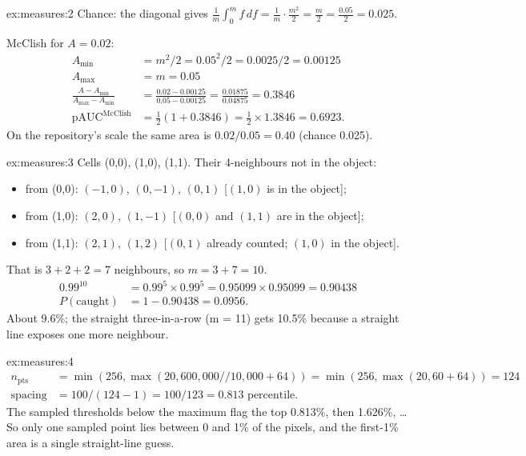 \begin{solution}{ex:measures:2}
Chance: the diagonal gives $\frac1m\int_0^m f\,df = \frac1m \cdot \frac{m^2}{2} = \frac m2 = \frac{0.05}{2} = 0.025$.

McClish for $A = 0.02$:
\begin{align*}
A_{\min} &= m^2/2 = 0.05^2 / 2 = 0.0025 / 2 = 0.00125\\
A_{\max} &= m = 0.05\\
\frac{A - A_{\min}}{A_{\max} - A_{\min}} &= \frac{0.02 - 0.00125}{0.05 - 0.00125} = \frac{0.01875}{0.04875} = 0.3846\\
\mathrm{pAUC}^{\text{McClish}} &= \tfrac12(1 + 0.3846) = \tfrac12 \times 1.3846 = 0.6923.
\end{align*}
On the repository's scale the same area is $0.02 / 0.05 = 0.40$ (chance 0.025).
\end{solution}

\begin{solution}{ex:measures:3}
Cells (0,0), (1,0), (1,1). Their 4-neighbours not in the object:
\begin{itemize}
\item from (0,0): $(-1,0)$, $(0,-1)$, $(0,1)$ [$(1,0)$ is in the object];
\item from (1,0): $(2,0)$, $(1,-1)$ [$(0,0)$ and $(1,1)$ are in the object];
\item from (1,1): $(2,1)$, $(1,2)$ [$(0,1)$ already counted; $(1,0)$ in the object].
\end{itemize}
That is $3 + 2 + 2 = 7$ neighbours, so $m = 3 + 7 = 10$.
\begin{align*}
0.99^{10} &= 0.99^5 \times 0.99^5 = 0.95099 \times 0.95099 = 0.90438\\
P(\text{caught}) &= 1 - 0.90438 = 0.0956.
\end{align*}
About 9.6\%; the straight three-in-a-row (m = 11) gets 10.5\% because a straight line exposes one more neighbour.
\end{solution}

\begin{solution}{ex:measures:4}
\begin{align*}
n_{\text{pts}} &= \min(256, \max(20, 600{,}000 /\!/ 10{,}000 + 64)) = \min(256, \max(20, 60 + 64)) = 124\\
\text{spacing} &= 100 / (124 - 1) = 100 / 123 = 0.813 \text{ percentile.}
\end{align*}
The sampled thresholds below the maximum flag the top 0.813\%, then 1.626\%, \ldots{} So only one sampled point
lies between 0 and 1\% of the pixels, and the first-1\% area is a single straight-line guess.
\end{solution}

